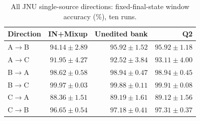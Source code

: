 \begin{table}[pos=htbp]
\centering\small
\caption{All JNU single-source directions: fixed-final-state window accuracy (\%), ten runs.}
\label{tab:sdgtasks}
\begin{tabular}{lrrr}
\toprule
Direction & IN+Mixup & Unedited bank & Q2\\
\midrule
A$\to$B & $94.14\pm2.89$ & $95.92\pm1.52$ & $95.92\pm1.18$\\
A$\to$C & $91.95\pm4.27$ & $92.52\pm3.84$ & $93.11\pm4.00$\\
B$\to$A & $98.62\pm0.58$ & $98.94\pm0.47$ & $98.94\pm0.45$\\
B$\to$C & $99.97\pm0.03$ & $99.88\pm0.11$ & $99.91\pm0.08$\\
C$\to$A & $88.36\pm1.51$ & $89.19\pm1.61$ & $89.12\pm1.56$\\
C$\to$B & $96.65\pm0.54$ & $97.18\pm0.41$ & $97.31\pm0.37$\\
\bottomrule
\end{tabular}
\end{table}
